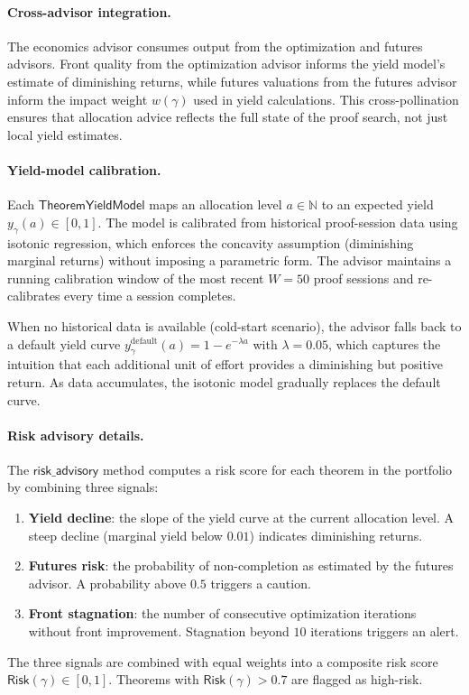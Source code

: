 \documentclass[11pt]{article}
\newcommand{\Risk}{\mathsf{Risk}}
\begin{document}
\paragraph{Cross-advisor integration.}
The economics advisor consumes output from the optimization and
futures advisors.  Front quality from the optimization advisor
informs the yield model's estimate of diminishing returns, while
futures valuations from the futures advisor inform the impact
weight $w(\gamma)$ used in yield calculations.  This
cross-pollination ensures that allocation advice reflects the
full state of the proof search, not just local yield estimates.

\paragraph{Yield-model calibration.}
Each $\mathsf{TheoremYieldModel}$ maps an allocation level
$a \in \mathbb{N}$ to an expected yield $y_\gamma(a) \in
[0, 1]$.  The model is calibrated from historical proof-session
data using isotonic regression, which enforces the concavity
assumption (diminishing marginal returns) without imposing a
parametric form.  The advisor maintains a running calibration
window of the most recent $W = 50$ proof sessions and
re-calibrates every time a session completes.

When no historical data is available (cold-start scenario), the
advisor falls back to a default yield curve
$y_\gamma^{\mathrm{default}}(a) = 1 - e^{-\lambda a}$ with
$\lambda = 0.05$, which captures the intuition that each
additional unit of effort provides a diminishing but positive
return.  As data accumulates, the isotonic model gradually
replaces the default curve.

\paragraph{Risk advisory details.}
The $\mathsf{risk\_advisory}$ method computes a risk score for
each theorem in the portfolio by combining three signals:
\begin{enumerate}
  \item \textbf{Yield decline}: the slope of the yield curve at
        the current allocation level.  A steep decline
        (marginal yield below $0.01$) indicates diminishing
        returns.
  \item \textbf{Futures risk}: the probability of non-completion
        as estimated by the futures advisor.  A probability
        above $0.5$ triggers a caution.
  \item \textbf{Front stagnation}: the number of consecutive
        optimization iterations without front improvement.
        Stagnation beyond $10$ iterations triggers an alert.
\end{enumerate}
The three signals are combined with equal weights into a
composite risk score $\Risk(\gamma) \in [0, 1]$.  Theorems
with $\Risk(\gamma) > 0.7$ are flagged as high-risk.
\end{document}
